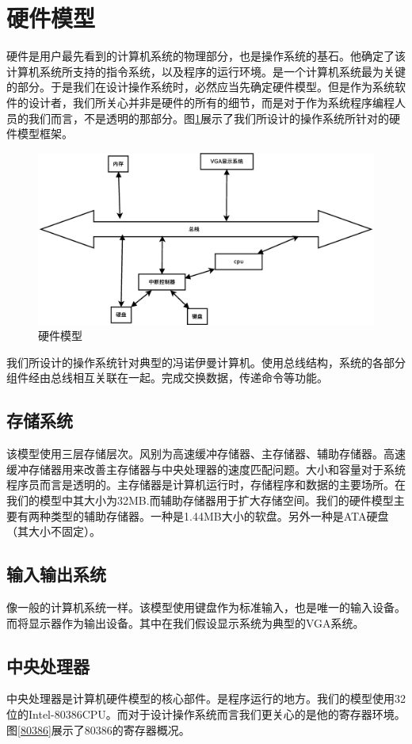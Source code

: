 \documentclass[UTF8,nofonts,cs4size]{ctexrep}
\begin{document}
\section{硬件模型}
硬件是用户最先看到的计算机系统的物理部分，也是操作系统的基石。他确定了该计算机系统所支持的指令系统，以及程序的运行环境。是一个计算机系统最为关键的部分。于是我们在设计操作系统时，必然应当先确定硬件模型。但是作为系统软件的设计者，我们所关心并非是硬件的所有的细节，而是对于作为系统程序编程人员的我们而言，不是透明的那部分。图\ref{hard}展示了我们所设计的操作系统所针对的硬件模型框架。
\begin{figure}[htp]
\centering
\includegraphics[scale=0.38]{sumti.eps}
\caption{硬件模型}
\label{hard}
\end{figure}

我们所设计的操作系统针对典型的冯诺伊曼计算机。使用总线结构，系统的各部分组件经由总线相互关联在一起。完成交换数据，传递命令等功能。
\subsection{存储系统}
该模型使用三层存储层次。风别为高速缓冲存储器、主存储器、辅助存储器。高速缓冲存储器用来改善主存储器与中央处理器的速度匹配问题。大小和容量对于系统程序员而言是透明的。主存储器是计算机运行时，存储程序和数据的主要场所。在我们的模型中其大小为32MB.而辅助存储器用于扩大存储空间。我们的硬件模型主要有两种类型的辅助存储器。一种是1.44MB大小的软盘。另外一种是ATA硬盘（其大小不固定）。                                                                                     
\subsection{输入输出系统}
像一般的计算机系统一样。该模型使用键盘作为标准输入，也是唯一的输入设备。而将显示器作为输出设备。其中在我们假设显示系统为典型的VGA系统。
\subsection{中央处理器}
中央处理器是计算机硬件模型的核心部件。是程序运行的地方。我们的模型使用32位的Intel-80386CPU。而对于设计操作系统而言我们更关心的是他的寄存器环境。图\ref{80386}展示了80386的寄存器概况。
\end{document}
